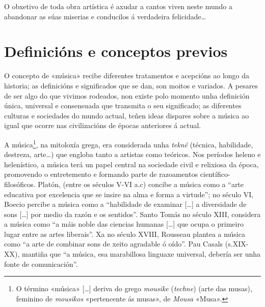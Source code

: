 \documentclass[a4paper, twoside]{templates/ociamthesis}
\begin{document}
\adjustmtc
{}

\begin{savequote}
O obxetivo de toda obra artística é axudar a cantos viven neste mundo a
abandonar as súas miserias e conducilos á verdadeira felicidade\ldots{}
\end{savequote}



\hypertarget{definiciuxf3ns-e-conceptos-previos}{%
\section*{Definicións e conceptos previos}\label{definiciuxf3ns-e-conceptos-previos}}

O concepto de «música» recibe diferentes tratamentos e acepcións ao longo da historia; as definicións e significados que se dan, son moitos e variados. A pesares de ser algo do que vivimos rodeados, non existe polo momento unha definición única, universal e consensuada que transmita o seu significado; as diferentes culturas e sociedades do mundo actual, teñen ideas dispares sobre a música ao igual que ocorre nas civilizacións de épocas anteriores á actual.

A música\footnote{O término «música» {[}\ldots{]} deriva do grego \emph{mousike} (\emph{techne}) (arte das musas), feminino de \emph{mousikos} «pertencente ás musas», de \emph{Mousa} «Musa».}, na mitoloxía grega, era considerada unha \emph{tekné} (técnica, habilidade, destreza, arte\ldots) que engloba tanto a artistas como teóricos. Nos períodos heleno e helenístico, a música terá un papel central na sociedade civil e relixiosa da época, promovendo o entretemento e formando parte de razoamentos científico-filosóficos. Platón, (entre os séculos V-VI a.c) concibe a música como a ``arte educativa por excelencia que se insire na alma e forma a virtude''; no século VI, Boecio percibe a música como a ``habilidade de examinar {[}\ldots{]} a diversidade de sons {[}\ldots{]} por medio da razón e os sentidos''. Santo Tomás no século XIII, considera a música como ``a máis noble das ciencias humanas {[}\ldots{]} que ocupa o primeiro lugar entre as artes liberais''. Xa no século XVIII, Rousseau plantea a música como ``a arte de combinar sons de xeito agradable ó oído''. Pau Casals (s.XIX-XX), mantiña que ``a música, esa marabillosa linguaxe universal, debería ser unha fonte de comunicación''.
\end{document}
